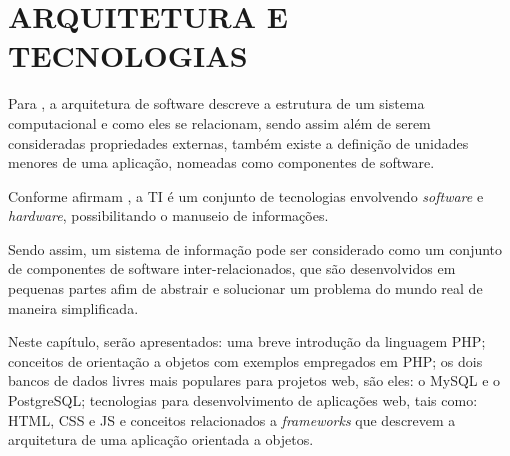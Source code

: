 \chapter{ARQUITETURA E TECNOLOGIAS}
\label{tecnologias}
 
Para , a arquitetura de software descreve a
estrutura de um sistema computacional e como eles se relacionam, sendo assim 
além de serem consideradas propriedades externas, também existe a definição de
unidades menores de uma aplicação, nomeadas como componentes de software.

Conforme afirmam
, a  \ac{TI} é um
conjunto de tecnologias envolvendo \textit{software} e \textit{hardware}, 
possibilitando o manuseio  de informações.

Sendo assim, um sistema de informação pode ser considerado como um conjunto de
componentes de software inter-relacionados, que são desenvolvidos em pequenas 
partes afim de abstrair e solucionar um problema do mundo real de maneira 
simplificada.
 
Neste capítulo, serão apresentados: uma breve introdução da linguagem \acs{PHP};
conceitos de orientação a objetos com exemplos empregados em \acs{PHP}; os 
dois bancos de dados livres mais populares para projetos web, são eles: o
\acs{MySQL} e o \acs{PostgreSQL}; tecnologias para desenvolvimento de aplicações
web, tais como: \acs{HTML}, \acs{CSS} e \acs{JS} e conceitos relacionados a
\textit{frameworks} que descrevem a arquitetura de uma aplicação orientada a
objetos.






